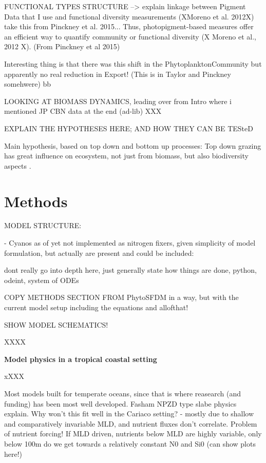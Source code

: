 FUNCTIONAL TYPES STRUCTURE --> explain linkage between Pigment Data that I use and functional diversity measurements (XMoreno et al. 2012X) take this from Pinckney et al. 2015...
Thus, photopigment-based measures offer an efficient way to quantify community or functional diversity (X Moreno et al., 2012 X). (From Pinckney et al 2015)

Interesting thing is that there was this shift in the PhytoplanktonCommunity but apparently no real reduction in Export! (This is in Taylor and Pinckney somehwere)
bb


LOOKING AT BIOMASS DYNAMICS, leading over from Intro where i mentioned JP CBN data at the end (ad-lib)
XXX

EXPLAIN THE HYPOTHESES HERE; AND HOW THEY CAN BE TESteD

Main hypothesis, based on top down and bottom up processes:
Top down grazing has great influence on ecosystem, not just from biomass, but also biodiversity aspects \cite{Prowe2012c}.


\section{Methods}

MODEL STRUCTURE: 

- Cyanos as of yet not implemented as nitrogen fixers, given simplicity of model formulation, but actually are present and could be included: \citep{Montes2013}

dont really go into depth here, just generally state how things are done, python, odeint, system of ODEs

COPY METHODS SECTION FROM PhytoSFDM in a way, but with the current model setup
including the equations and allofthat!

SHOW MODEL SCHEMATICS!

XXXX


\small {\textbf{Model physics in a tropical coastal setting}}

xXXX

Most models built for temperate oceans, since that is where reasearch (and funding) has been most well developed. Fasham NPZD type slabe physics explain.
Why won't this fit well in the Cariaco setting? - mostly due to shallow and comparatively invariable MLD, and nutrient fluxes don't correlate.
Problem of nutrient forcing! If MLD driven, nutrients below MLD are highly variable, only below 100m do we get towards a relatively constant N0 and Si0 (can show plots here!)

